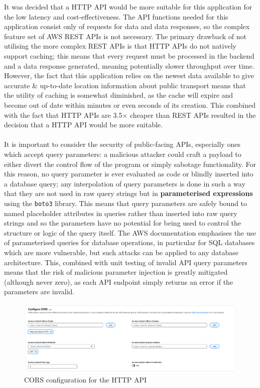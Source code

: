 \documentclass[a4paper,11pt]{report}
\begin{document}
It was decided that a HTTP API would be more suitable for this application for the low latency and cost-effectiveness.
The API functions needed for this application consist only of requests for data and data responses, so the complex feature set of AWS REST APIs is not necessary.
The primary drawback of not utilising the more complex REST APIs is that HTTP APIs do not natively support caching;
this means that every request must be processed in the backend and a data response generated, meaning potentially slower throughput over time.
However, the fact that this application relies on the newest data available to give accurate \& up-to-date location information about public transport means that the utility of caching is somewhat diminished, as the cache will expire and become out of date within minutes or even seconds of its creation.
This combined with the fact that HTTP APIs are 3.5$\times$ cheaper\supercite{apipricing} than REST APIs resulted in the decision that a HTTP API would be more suitable.
\\\\
It is important to consider the security of public-facing APIs, especially ones which accept query parameters: a malicious attacker could craft a payload to either divert the control flow of the program or simply sabotage functionality.
For this reason, no query parameter is ever evaluated as code or blindly inserted into a database query;
any interpolation of query parameters is done in such a way that they are not used in raw query strings but in \textbf{parameterised expressions} using the \texttt{boto3} library\supercite{boto3query}.
This means that query parameters are safely bound to named placeholder attributes in queries rather than inserted into raw query strings and so the parameters have no potential for being used to control the structure or logic of the query itself.
The AWS documentation emphasises the use of parameterised queries for database operations, in particular for SQL databases which are more vulnerable, but such attacks can be applied to any database architecture\supercite{useparameterisedqueries}. 
This, combined with unit testing of invalid API query parameters means that the risk of malicious parameter injection is greatly mitigated (although never zero), as each API endpoint simply returns an error if the parameters are invalid.

\begin{figure}[H]
    \centering
    \includegraphics[width=\textwidth]{./images/api_cors_configuration.png}
    \caption{CORS configuration for the HTTP API}
\end{figure}
\end{document}
